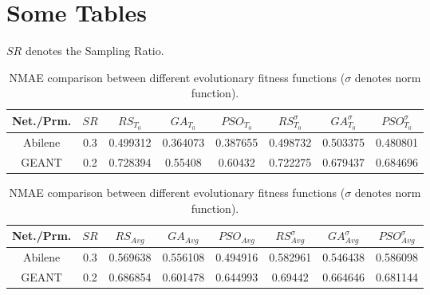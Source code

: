 \section{Some Tables}


$SR$ denotes the Sampling Ratio.

\begin{table}
	\centering
 \footnotesize{
 \renewcommand{\tabcolsep}{0.05cm}
 \renewcommand{\arraystretch}{1.0}
		\begin{tabular}{| c | c | c | c | c | c | c | c |}
		\hline
       Net./Prm. & $SR$ & $RS_{T_{0}}$ & $GA_{T_{0}}$ & $PSO_{T_{0}}$ & $RS^{\sigma}_{T_{0}}$ & $GA^{\sigma}_{T_{0}}$ & $PSO^{\sigma}_{T_{0}}$  \\ \hline
      Abilene    & 0.3 & 0.499312 & 0.364073 & 0.387655 & 0.498732 & 0.503375 & 0.480801 \\ \hline
      GEANT      & 0.2 & 0.728394 & 0.55408 & 0.60432 & 0.722275 & 0.679437 & 0.684696 \\ \hline
    \end{tabular}
    \newline
\vspace*{0.15cm}
\newline
		\begin{tabular}{| c | c | c | c | c | c | c | c |}
		\hline
       Net./Prm. & $SR$ & $RS_{Avg}$ & $GA_{Avg}$ & $PSO_{Avg}$ & $RS^{\sigma}_{Avg}$ & $GA^{\sigma}_{Avg}$ & $PSO^{\sigma}_{Avg}$  \\ \hline
      Abilene    & 0.3 & 0.569638 & 0.556108 & 0.494916 & 0.582961 & 0.546438 & 0.586098  \\ \hline
      GEANT      & 0.2 & 0.686854 & 0.601478 & 0.644993 & 0.69442 & 0.664646 & 0.681144  \\ \hline
    \end{tabular}
	\caption{\scriptsize{NMAE comparison between different evolutionary fitness functions ($\sigma$ denotes norm function).}}
	\label{tab:FitFuncCmp1}
}
\end{table}



